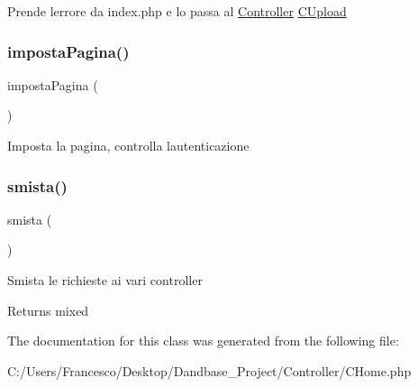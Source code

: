 Prende l\textquotesingle{}errore da index.\+php e lo passa al \mbox{\hyperlink{namespace_controller}{Controller}} \mbox{\hyperlink{class_c_upload}{C\+Upload}} \mbox{\label{class_c_home_a711c4b2a5339ead56b3957d242895d96}} 
\subsubsection{\texorpdfstring{imposta\+Pagina()}{impostaPagina()}}
{\footnotesize\ttfamily imposta\+Pagina (\begin{DoxyParamCaption}{ }\end{DoxyParamCaption})}

Imposta la pagina, controlla l\textquotesingle{}autenticazione \mbox{\label{class_c_home_afc7ba180569cef3535974cfc4a1211f1}} 
\subsubsection{\texorpdfstring{smista()}{smista()}}
{\footnotesize\ttfamily smista (\begin{DoxyParamCaption}{ }\end{DoxyParamCaption})}

Smista le richieste ai vari controller

\begin{DoxyReturn}{Returns}
mixed 
\end{DoxyReturn}


The documentation for this class was generated from the following file\+:\begin{DoxyCompactItemize}
\item 
C\+:/\+Users/\+Francesco/\+Desktop/\+Dandbase\+\_\+\+Project/\+Controller/C\+Home.\+php\end{DoxyCompactItemize}
